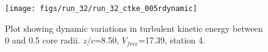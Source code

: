 \begin{figure}[H]
\centering
\texttt{[image: figs/run\_32/run\_32\_ctke\_005rdynamic]}
\caption{Plot showing dynamic variations in turbulent kinetic energy between 0 and 0.5 core radii. $z/c$=8.50, $V_{free}$=17.39, station 4.}
\label{fig:run_32_ctke_005rdynamic}
\end{figure}


